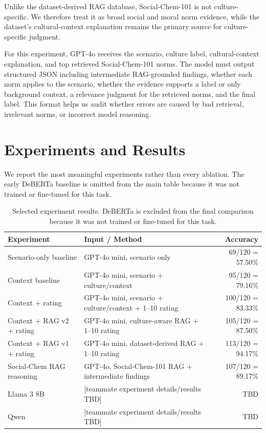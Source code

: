 Unlike the dataset-derived RAG database, Social-Chem-101 is not culture-specific. We therefore treat it as broad social and moral norm evidence, while the dataset's cultural-context explanation remains the primary source for culture-specific judgment.

For this experiment, GPT-4o receives the scenario, culture label, cultural-context explanation, and top retrieved Social-Chem-101 norms. The model must output structured JSON including intermediate RAG-grounded findings, whether each norm applies to the scenario, whether the evidence supports a label or only background context, a relevance judgment for the retrieved norms, and the final label. This format helps us audit whether errors are caused by bad retrieval, irrelevant norms, or incorrect model reasoning.

\section{Experiments and Results}

We report the most meaningful experiments rather than every ablation. The early DeBERTa baseline is omitted from the main table because it was not trained or fine-tuned for this task.

\begin{table}[t]
\centering
\small
\begin{tabular}{llr}
\hline
Experiment & Input / Method & Accuracy \\
\hline
Scenario-only baseline & GPT-4o mini, scenario only & 69/120 = 57.50\% \\
Context baseline & GPT-4o mini, scenario + culture/context & 95/120 = 79.16\% \\
Context + rating & GPT-4o mini, scenario + culture/context + 1--10 rating & 100/120 = 83.33\% \\
Context + RAG v2 + rating & GPT-4o mini, culture-aware RAG + 1--10 rating & 105/120 = 87.50\% \\
Context + RAG v1 + rating & GPT-4o mini, dataset-derived RAG + 1--10 rating & 113/120 = 94.17\% \\
Social-Chem RAG reasoning & GPT-4o, Social-Chem-101 RAG + intermediate findings & 107/120 = 89.17\% \\
Llama 3 8B & [teammate experiment details/results TBD] & TBD \\
Qwen & [teammate experiment details/results TBD] & TBD \\
\hline
\end{tabular}
\caption{Selected experiment results. DeBERTa is excluded from the final comparison because it was not trained or fine-tuned for this task.}
\end{table}

